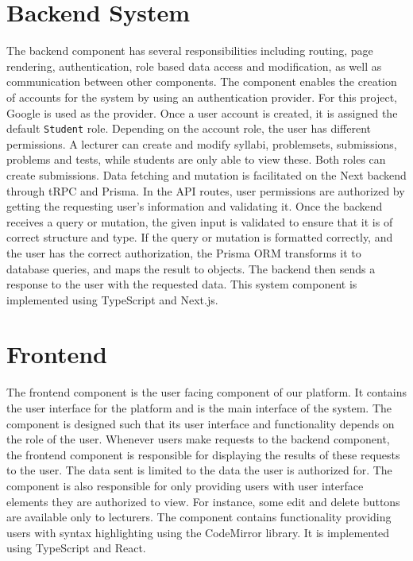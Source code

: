 \section{Backend System}
The backend component has several responsibilities including routing, page rendering, authentication, role based data access and modification, as well as communication between other components.
The component enables the creation of accounts for the system by using an authentication provider.
For this project, Google is used as the provider.
Once a user account is created, it is assigned the default \texttt{Student} role.
Depending on the account role, the user has different permissions.
A lecturer can create and modify syllabi, problemsets, submissions, problems and tests, while students are only able to view these. Both roles can create submissions.
Data fetching and mutation is facilitated on the Next backend through tRPC and Prisma. In the API routes, user permissions are authorized by getting the requesting user's information and validating it.
Once the backend receives a query or mutation, the given input is validated to ensure that it is of correct structure and type.
If the query or mutation is formatted correctly, and the user has the correct authorization, the Prisma ORM transforms it to database queries, and maps the result to \javascript{} objects.
The backend then sends a response to the user with the requested data.
This system component is implemented using TypeScript and Next.js.

\section{Frontend} \label{sec:architecture-frontend}
The frontend component is the user facing component of our platform.  It contains the user interface for the platform and is the main interface of the system.
The component is designed such that its user interface and functionality depends on the role of the user.
Whenever users make requests to the backend component, the frontend component is responsible for displaying the results of these requests to the user. The data sent is limited to the data the user is authorized for.
The component is also responsible for only providing users with user interface elements they are authorized to view.
For instance, some edit and delete buttons are available only to lecturers.
The component contains functionality providing users with syntax highlighting using the CodeMirror library.
It is implemented using TypeScript and React.

